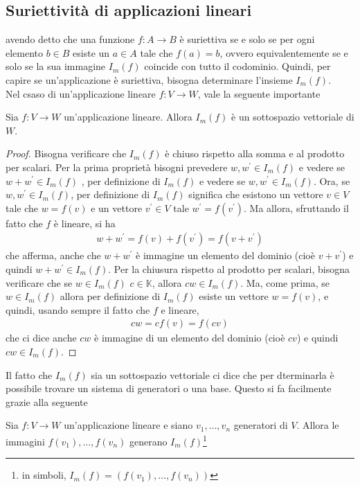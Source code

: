 \subsection{Suriettività di applicazioni lineari}
\label{sec:suriappllin}
avendo detto che una funzione $f:A\to B$ è suriettiva se e solo se per
ogni elemento $b\in B$ esiste un $a\in A$ tale che $f(a)=b$, ovvero
equivalentemente se e solo se la sua immagine $I_m(f)$ coincide con tutto
il codominio. Quindi, per capire se un'applicazione è suriettiva,
bisogna determinare l'insieme $I_m(f)$.\\
Nel csaso di un'applicazione lineare $f:V\to W$, vale la seguente
importante
\begin{prop}
  \label{prop:suriappllin1}
  Sia $f:V\to W$ un'applicazione lineare. Allora $I_m(f)$ è un
  sottospazio vettoriale di $W$.
\end{prop}
\begin{proof}
  Bisogna verificare che $I_m(f)$ è chiuso rispetto alla somma e al
  prodotto per scalari. Per la prima proprietà bisogni prevedere $w,
  w^\prime\in I_m(f)$ e vedere se $w+w^\prime\in I_m(f)$ , per definizione
  di $I_m(f)$ e vedere se $w,w^\prime\in I_m(f)$. Ora, se
  $w,w^\prime\in I_m(f)$, per definizione di $I_m(f)$ significa che
  esistono un vettore $v\in V$ tale che $w=f(v)$ e un vettore
  $v^\prime\in V$ tale $w^\prime=f(v^\prime)$. Ma allora, sfruttando il
  fatto che $f$ è lineare, si ha
  \begin{eqnarray*}
    w+w^\prime=f(v)+f(v^\prime)=f(v+v^\prime)
  \end{eqnarray*}
  che afferma, anche che $w+w^\prime$ è immagine un elemento del dominio
  (cioè $v+v^\prime$) e quindi $w+w^\prime\in I_m(f)$.
  Per la chiusura rispetto al prodotto per scalari, bisogna verificare
  che se $w\in I_m(f)$ $c\in \mathds{K}$, allora $cw\in I_m(f)$. Ma, come
  prima, se $w\in I_m(f)$ allora per definizione di $I_m(f)$ esiste un
  vettore $w=f(v)$, e quindi, usando sempre il fatto che $f$ e lineare,
  \begin{eqnarray*}
    cw=cf(v)=f(cv)
  \end{eqnarray*}
  che ci dice anche $cw$ è immagine di un elemento del dominio (cioè
  $cv$) e quindi $cw\in I_m(f)$.
\end{proof}
Il fatto che $I_m(f)$ sia un sottospazio vettoriale ci dice che per
dterminarla è possibile trovare un sistema di generatori o una base.
Questo si fa facilmente grazie alla seguente
\begin{prop}
  \label{prop:suriappllin2}
  Sia $f:V\to W$ un'applicazione lineare e siano $v_1,\dots, v_n$
  generatori di $V$. Allora le immagini $f(v_1),\dots,f(v_n)$ generano
  $I_m(f)$\footnote{in simboli, $I_m(f)=(f(v_1),\dots,f(v_n))$}
\end{prop}
